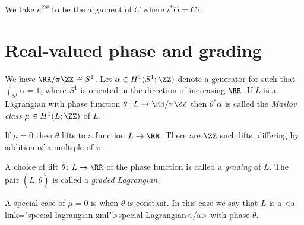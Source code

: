 \documentclass{article}
\begin{document}
We take $e^{i2\theta}$ to be the argument of $C$ where $\iota^*\mho=C\tau$.

\section{Real-valued phase and grading}

\begin{Definition}[maslovclass]
  We have $\RR/\pi\ZZ\cong S^1$. Let $\alpha\in H^1(S^1;\ZZ)$ denote a generator for such that $\int_{S^1}\alpha=1$, where $S^1$ is oriented in the direction of increasing $\RR$. If $L$ is a Lagrangian with phase function $\theta\colon L\to\RR/\pi\ZZ$ then $\theta^*\alpha$ is called the {\em Maslov class} $\mu\in H^1(L;\ZZ)$ of $L$.
\end{Definition}

If $\mu=0$ then $\theta$ lifts to a function $L\to\RR$. There are $\ZZ$ such lifts, differing by addition of a multiple of $\pi$.

\begin{Definition}[gradedlag]
  A choice of lift $\tilde{\theta}\colon L\to\RR$ of the phase function is called a {\em grading} of $L$. The pair $(L,\tilde{\theta})$ is called a {\em graded Lagrangian}.
\end{Definition}

\begin{Definition}[speciallagrangian]
  A special case of $\mu=0$ is when $\theta$ is constant. In this case we say that $L$ is a <a link="special-lagrangian.xml">special Lagrangian</a> with phase $\theta$.
\end{Definition}
\end{document}
